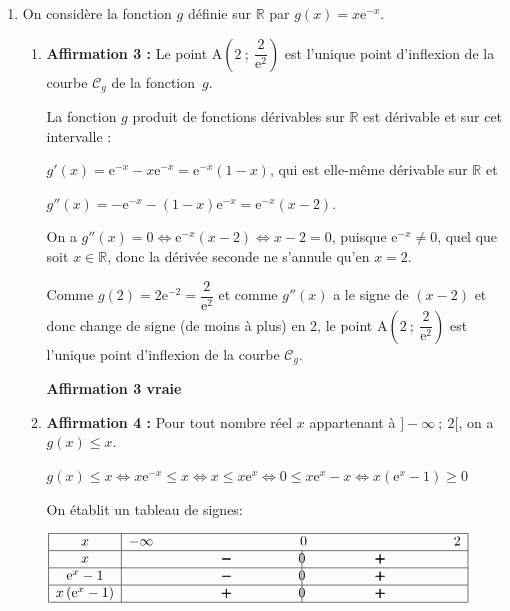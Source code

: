 \documentclass[10pt]{article}
\providecommand{\R}{\mathbb{R}}
\providecommand{\e}{{\mathrm{e}}}
\begin{document}
\begin{enumerate}
\begin{enumerate}
Comme $\displaystyle\lim_{x \to - \infty} f(x) = 5$, on a donc $\displaystyle\lim_{x \to - \infty} f(x) - 5 = 0^{-}$ et donc\\
 $\displaystyle\lim_{x \to - \infty} \dfrac{1}{f(x) - 5} = - \infty$ et enfin  $\displaystyle\lim_{x \to - \infty} \dfrac{2}{f(x) - 5} = - \infty$.
 
 \hfill\textbf{Affirmation 2 fausse}
	\end{enumerate}
	
\item On considère la fonction $g$ définie sur $\R$ par $g(x) = x\e^{-x}$.
	\begin{enumerate}
	
		\item \textbf{Affirmation 3 :} 
\og  Le point A$\left(2~;~\dfrac{2}{\e^2}\right)$ est l'unique point d'inflexion de la courbe $\mathcal{C}_g$ de la fonction~$g$. \fg{} 

La fonction $g$ produit de fonctions dérivables sur $\R$ est dérivable et sur cet intervalle :

$g'(x) = \e^{-x} - x\e^{-x} = \e^{-x}(1 - x)$, qui est elle-même dérivable sur $\R$ et 

$g''(x) = -\e^{-x} - (1 - x)\e^{-x} = \e^{-x}(x - 2)$.

On a $g''(x) = 0 \iff \e^{-x}(x - 2) \iff x - 2 = 0$, puisque $\e^{-x} \ne 0$, quel que soit $x \in \R$, donc la dérivée seconde ne s'annule qu'en $x = 2$.

Comme $g(2) = 2\e^{-2} = \dfrac{2}{\e^2}$ et comme $g''(x)$ a le signe de $(x - 2)$ et donc change de signe (de moins à plus) en 2, le point A$\left(2~;~\dfrac{2}{\e^2}\right)$ est l'unique point d'inflexion de la courbe $\mathcal{C}_g$.

 \hfill\textbf{Affirmation 3 vraie}
 
		\item \textbf{Affirmation 4 :} 
\og  Pour tout nombre réel $x$ appartenant à $] - \infty~;~2[$, on a $g(x) \leqslant x$. \fg{} 

$g(x) \leqslant x \iff x\e^{-x} \leqslant x \iff x \leqslant x\e^{x} \iff 0 \leqslant x\e^{x}-x \iff x\left (\e^{x}-1\right )\geqslant 0$

On établit un tableau de signes:

\begin{center}
{
\def\esp{\hspace*{3cm}}
$\begin{array}{|c | *{5}{c} |} 
\hline
x  & -\infty & \esp & 0 & \esp  & 2 \\
\hline
x &  & \pmb{-} &  \vline\hspace{-2.7pt}{0} & \pmb{+} &   \\
\hline
\e^{x}-1 &  & \pmb{-} &  \vline\hspace{-2.7pt}{0} & \pmb{+} &   \\
\hline
x\left (\e^{x}-1\right ) &  & \pmb{+} &  \vline\hspace{-2.7pt}{0} & \pmb{+} &   \\
\hline
\end{array}$
}
\end{center}


\end{enumerate}
\end{enumerate}
\end{document}
